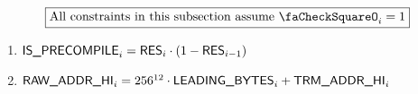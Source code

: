 \[
    \boxed{\text{All constraints in this subsection assume } \done_{i} = 1 }
\]
\begin{enumerate}
	\item $\textsf{IS\_PRECOMPILE}_{i} = \textsf{RES}_{i} \cdot (1 - \textsf{RES}_{i-1})$
	\item $\textsf{RAW\_ADDR\_HI}_{i} = 256^{12} \cdot \textsf{LEADING\_BYTES}_{i} + \textsf{TRM}\textsf{\_}\textsf{ADDR}\textsf{\_HI}_{i}$
\end{enumerate}	

